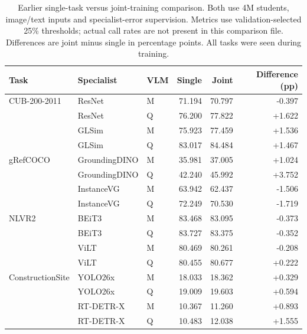 \begin{table}[H]
\centering
\caption{Earlier single-task versus joint-training comparison. Both use 4M students, image/text inputs and specialist-error supervision. Metrics use validation-selected 25\% thresholds; actual call rates are not present in this comparison file. Differences are joint minus single in percentage points. All tasks were seen during training.}
\label{tab:joint_full}
\fontsize{9}{10.799999999999999}\selectfont
\setlength{\tabcolsep}{5pt}
\renewcommand{\arraystretch}{1.12}
\begin{tabular}{@{}lllrrr@{}}
\toprule
Task & Specialist & VLM & Single & Joint & Difference (pp) \\
\midrule
CUB-200-2011 & ResNet & M & 71.194 & 70.797 & -0.397 \\
 & ResNet & Q & 76.200 & 77.822 & +1.622 \\
 & GLSim & M & 75.923 & 77.459 & +1.536 \\
 & GLSim & Q & 83.017 & 84.484 & +1.467 \\
\midrule
gRefCOCO & GroundingDINO & M & 35.981 & 37.005 & +1.024 \\
 & GroundingDINO & Q & 42.240 & 45.992 & +3.752 \\
 & InstanceVG & M & 63.942 & 62.437 & -1.506 \\
 & InstanceVG & Q & 72.249 & 70.530 & -1.719 \\
\midrule
NLVR2 & BEiT3 & M & 83.468 & 83.095 & -0.373 \\
 & BEiT3 & Q & 83.727 & 83.375 & -0.352 \\
 & ViLT & M & 80.469 & 80.261 & -0.208 \\
 & ViLT & Q & 80.455 & 80.677 & +0.222 \\
\midrule
ConstructionSite & YOLO26x & M & 18.033 & 18.362 & +0.329 \\
 & YOLO26x & Q & 19.009 & 19.603 & +0.594 \\
 & RT-DETR-X & M & 10.367 & 11.260 & +0.893 \\
 & RT-DETR-X & Q & 10.483 & 12.038 & +1.555 \\
\bottomrule
\end{tabular}
\end{table}
